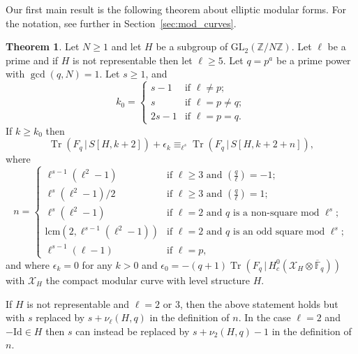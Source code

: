 \documentclass[10pt]{article}
\theoremstyle{definition}
\newtheorem{theorem}{Theorem}[section]
\DeclareMathOperator\Tr{Tr}
\renewcommand{\:}{\colon}
\newcommand{\F}{\mathbb{F}}
\begin{document}
Our first main result is the following theorem about elliptic modular forms. For the notation, see further in Section~\ref{sec:mod_curves}. 
\begin{theorem}\label{thm:trace_periodicity} 
    Let $N\geq 1$ and let $H$ be a subgroup
    of $\mathrm{GL}_2(\mathbb Z/N\mathbb Z)$.
    Let $\ell$ be a prime and if $H$ is not representable then let $\ell \geq 5$. Let $q=p^a$ be a prime power with $\gcd(q,N)=1$. 
    Let $s \geq 1$, and  
    \[
    k_0 = \begin{cases} s-1 & \text{if } \ell \neq p; \\ s & \text{if } \ell = p \neq q; \\
    2s-1 & \text{if } \ell = p = q.
    \end{cases}
    \]
    \noindent If $k \geq k_0$ then   
    \[
    \Tr(F_q \, | \, S[H,k+2]) + \epsilon_k \equiv_{\ell^s} \Tr(F_q \, | \, S[H,k+2+n]),
    \]
    where 
    \[
    n =
    \begin{cases}
    \ell^{s-1}(\ell^2-1) & \text{if } \ell\geq 3 \text{ and }  \left( \frac{q}{\ell} \right) = -1 ; \\
    \ell^{s}(\ell^2-1)/2 & \text{if } \ell\geq 3 \text{ and } \left( \frac{q}{\ell} \right) = 1;\\
    \ell^{s}(\ell^2-1) & \text{if } \ell=2 \text{ and } q \text{ is a non-square mod } \ell^s; \\
    \text{lcm}(2,\ell^{s-1}(\ell^2-1)) & \text{if } \ell=2 \text{ and } q \text{ is an odd square mod } \ell^s; \\
    \ell^{s-1}(\ell-1) & \text{if } \ell = p, 
    \end{cases}
    \]
     and where $\epsilon_k=0$ for any $k>0$ and $\epsilon_0=-(q+1) \Tr(F_q \, | \, H_c^0(\mathcal X_H\otimes \overline{\F}_q))$ with
     $\mathcal X_H$ the compact modular curve with level structure $H$.  

    If $H$ is not representable and $\ell=2$ or $3$, then the above statement holds but with $s$ replaced by $s+\nu_\ell(H,q)$ in the definition of $n$. 
    In the case $\ell=2$ and $-\mathrm{Id}\in H$ then $s$ can instead be replaced by $s+\nu_2(H,q)-1$ in the definition of~$n$.
\end{theorem}
\end{document}
